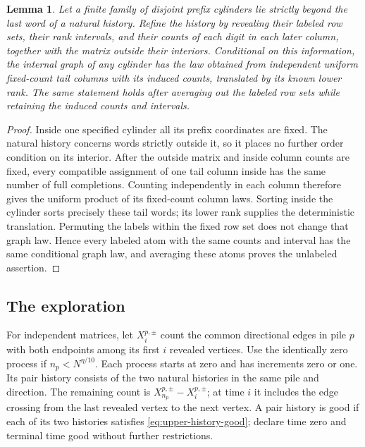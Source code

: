 \documentclass[11pt]{article}
\numberwithin{equation}{section}
\newtheorem{lemma}[theorem]{Lemma}
\theoremstyle{definition}
\theoremstyle{remark}
\newcommand{\1}{\mathbf 1}
\begin{document}
\begin{lemma}%
\label{lem:upper-induced-law}
Let a finite family of disjoint prefix cylinders lie strictly beyond
the last word of a natural history. Refine the history by revealing
their labeled row sets, their rank intervals, and their counts of
each digit in each later column, together with the matrix outside
their interiors. Conditional on this information, the internal
graph of any cylinder has the law obtained from independent uniform
fixed-count tail columns with its induced counts, translated by its
known lower rank. The same statement holds after averaging out the
labeled row sets while retaining the induced counts and intervals.
\end{lemma}
\begin{proof}
Inside one specified cylinder all its prefix coordinates are fixed.
The natural history concerns words strictly outside it, so it places
no further order condition on its interior. After the outside matrix
and inside column counts are fixed, every compatible assignment of
one tail column inside has the same number of full completions.
Counting independently in each column therefore gives the uniform
product of its fixed-count column laws. Sorting inside the cylinder
sorts precisely these tail words; its lower rank supplies the
deterministic translation. Permuting the labels within the fixed
row set does not change that graph law. Hence every labeled atom
with the same counts and interval has the same conditional graph
law, and averaging these atoms proves the unlabeled assertion.
\end{proof}

\subsection{The exploration}
For independent matrices, let $X_i^{p,\pm}$ count the common
directional edges in pile $p$ with both endpoints among its first
$i$ revealed vertices. Use the identically zero process if
$n_p<N^{\eta/10}$. Each process starts at zero and has increments
zero or one. Its pair history consists of the two natural histories
in the same pile and direction. The remaining count is
$X_{n_p}^{p,\pm}-X_i^{p,\pm}$; at time $i$ it includes the edge
crossing from the last revealed vertex to the next vertex.
A pair history is good if each of its two histories satisfies
\eqref{eq:upper-history-good}; declare time zero and terminal time
good without further restrictions.
\end{document}

